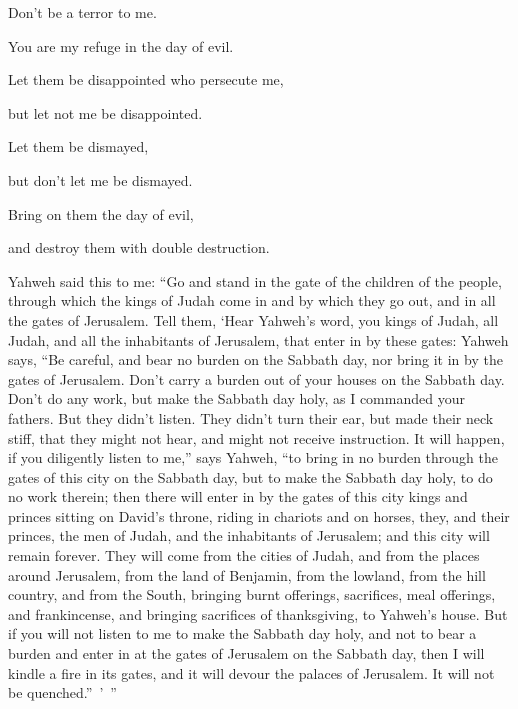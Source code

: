 {\par }{\Q {}Don’t be a terror to me.
\par }{\QB You are my refuge in the day of evil.
\par }{\Q {}Let them be disappointed who persecute me,
\par }{\QB but let not me be disappointed.
\par }{\Q Let them be dismayed,
\par }{\QB but don’t let me be dismayed.
\par }{\Q Bring on them the day of evil,
\par }{\QB and destroy them with double destruction.
\par }{\PP {}Yahweh said this to me: “Go and stand in the gate of the children of the people, through which the kings of Judah come in and by which they go out, and in all the gates of Jerusalem.
Tell them, ‘Hear Yahweh’s word, you kings of Judah, all Judah, and all the inhabitants of Jerusalem, that enter in by these gates:
Yahweh says, “Be careful, and bear no burden on the Sabbath day, nor bring it in by the gates of Jerusalem.
Don’t carry a burden out of your houses on the Sabbath day. Don’t do any work, but make the Sabbath day holy, as I commanded your fathers.
But they didn’t listen. They didn’t turn their ear, but made their neck stiff, that they might not hear, and might not receive instruction.
It will happen, if you diligently listen to me,” says Yahweh, “to bring in no burden through the gates of this city on the Sabbath day, but to make the Sabbath day holy, to do no work therein;
then there will enter in by the gates of this city kings and princes sitting on David’s throne, riding in chariots and on horses, they, and their princes, the men of Judah, and the inhabitants of Jerusalem; and this city will remain forever.
They will come from the cities of Judah, and from the places around Jerusalem, from the land of Benjamin, from the lowland, from the hill country, and from the South, bringing burnt offerings, sacrifices, meal offerings, and frankincense, and bringing sacrifices of thanksgiving, to Yahweh’s house.
But if you will not listen to me to make the Sabbath day holy, and not to bear a burden and enter in at the gates of Jerusalem on the Sabbath day, then I will kindle a fire in its gates, and it will devour the palaces of Jerusalem. It will not be quenched.” ’ ”

}

